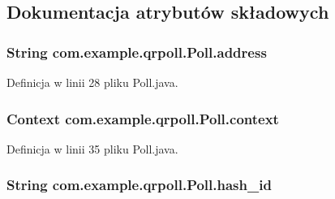 \subsection{Dokumentacja atrybutów składowych}
\hypertarget{classcom_1_1example_1_1qrpoll_1_1_poll_a284d664b1db022d0fe8f089c4cad5ead}{
\subsubsection[{address}]{\setlength{\rightskip}{0pt plus 5cm}String com.\+example.\+qrpoll.\+Poll.\+address\hspace{0.3cm}{\ttfamily [private]}}}\label{classcom_1_1example_1_1qrpoll_1_1_poll_a284d664b1db022d0fe8f089c4cad5ead}


Definicja w linii 28 pliku Poll.\+java.

\hypertarget{classcom_1_1example_1_1qrpoll_1_1_poll_a22159bb6ccaf5330c7691c47fcb0ea00}{
\subsubsection[{context}]{\setlength{\rightskip}{0pt plus 5cm}Context com.\+example.\+qrpoll.\+Poll.\+context\hspace{0.3cm}{\ttfamily [private]}}}\label{classcom_1_1example_1_1qrpoll_1_1_poll_a22159bb6ccaf5330c7691c47fcb0ea00}


Definicja w linii 35 pliku Poll.\+java.

\hypertarget{classcom_1_1example_1_1qrpoll_1_1_poll_acbb2a9859e39f1b1ce48e75c95eb3866}{
\subsubsection[{hash\+\_\+id}]{\setlength{\rightskip}{0pt plus 5cm}String com.\+example.\+qrpoll.\+Poll.\+hash\+\_\+id\hspace{0.3cm}{\ttfamily [private]}}}\label{classcom_1_1example_1_1qrpoll_1_1_poll_acbb2a9859e39f1b1ce48e75c95eb3866}


